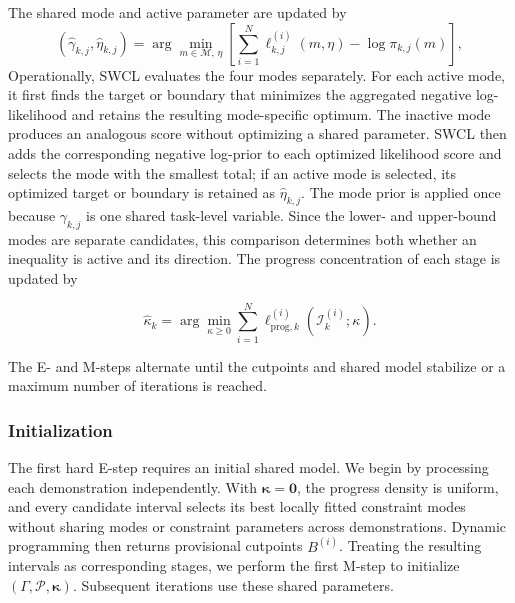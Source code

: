 The shared mode and active parameter are updated by
\begin{equation}
(\hat\gamma_{k,j},\hat\eta_{k,j})
=
\arg\min_{m\in\mathcal{M},\,\eta}
\left[
\sum_{i=1}^{N}
\ell_{k,j}^{(i)}(m,\eta)
-\log\pi_{k,j}(m)
\right],
\label{eq:shared_mode_update}
\end{equation}
Operationally, SWCL evaluates the four modes separately. For each active mode, it first finds the target or boundary that minimizes the aggregated negative log-likelihood and retains the resulting mode-specific optimum. The inactive mode produces an analogous score without optimizing a shared parameter. SWCL then adds the corresponding negative log-prior to each optimized likelihood score and selects the mode with the smallest total; if an active mode is selected, its optimized target or boundary is retained as $\hat\eta_{k,j}$. The mode prior is applied once because $\gamma_{k,j}$ is one shared task-level variable. Since the lower- and upper-bound modes are separate candidates, this comparison determines both whether an inequality is active and its direction. The progress concentration of each stage is updated by

\begin{equation}
\hat\kappa_k
=
\arg\min_{\kappa\geq0}
\sum_{i=1}^{N}
\ell_{\mathrm{prog},k}^{(i)}
\!\left(\mathcal{I}_k^{(i)};\kappa\right).
\label{eq:progress_kappa_update}
\end{equation}

The E- and M-steps alternate until the cutpoints and shared model stabilize or a maximum number of iterations is reached.

\subsubsection{Initialization}
The first hard E-step requires an initial shared model. We begin by processing each demonstration independently. With $\boldsymbol{\kappa}=\mathbf{0}$, the progress density is uniform, and every candidate interval selects its best locally fitted constraint modes without sharing modes or constraint parameters across demonstrations. Dynamic programming then returns provisional cutpoints $B^{(i)}$. Treating the resulting intervals as corresponding stages, we perform the first M-step to initialize $(\Gamma,\mathcal{P},\boldsymbol{\kappa})$. Subsequent iterations use these shared parameters.

